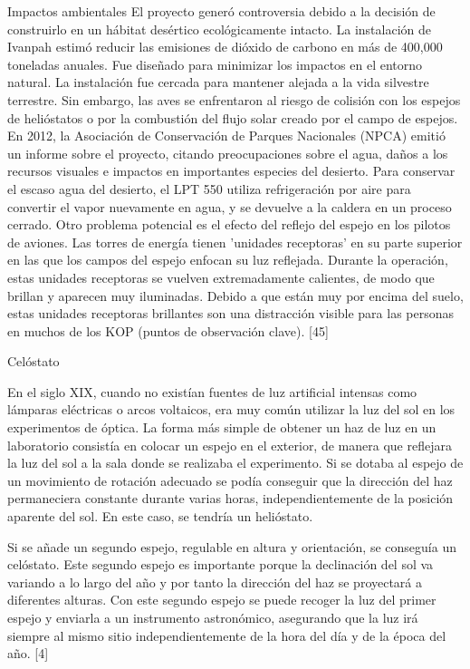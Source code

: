 \documentclass[12pt]{article}
\begin{document}
Impactos ambientales
El proyecto generó controversia debido a la decisión de construirlo en un hábitat desértico ecológicamente intacto. La instalación de Ivanpah estimó reducir las emisiones de dióxido de carbono en más de 400,000 toneladas anuales. Fue diseñado para minimizar los impactos en el entorno natural. La instalación fue cercada para mantener alejada a la vida silvestre terrestre. Sin embargo, las aves se enfrentaron al riesgo de colisión con los espejos de helióstatos o por la combustión del flujo solar creado por el campo de espejos.
En 2012, la Asociación de Conservación de Parques Nacionales (NPCA) emitió un informe sobre el proyecto, citando preocupaciones sobre el agua, daños a los recursos visuales e impactos en importantes especies del desierto. Para conservar el escaso agua del desierto, el LPT 550 utiliza refrigeración por aire para convertir el vapor nuevamente en agua, y se devuelve a la caldera en un proceso cerrado.
Otro problema potencial es el efecto del reflejo del espejo en los pilotos de aviones. Las torres de energía tienen 'unidades receptoras' en su parte superior en las que los campos del espejo enfocan su luz reflejada. Durante la operación, estas unidades receptoras se vuelven extremadamente calientes, de modo que brillan y aparecen muy iluminadas. Debido a que están muy por encima del suelo, estas unidades receptoras brillantes son una distracción visible para las personas en muchos de los KOP (puntos de observación clave). [45]
 
 
Celóstato

En el siglo XIX, cuando no existían fuentes de luz artificial intensas como lámparas eléctricas o arcos voltaicos, era muy común utilizar la luz del sol en los experimentos de óptica. La forma más simple de obtener un haz de luz en un laboratorio consistía en colocar un espejo en el exterior, de manera que reflejara la luz del sol a la sala donde se realizaba el experimento. Si se dotaba al espejo de un movimiento de rotación adecuado se podía conseguir que la dirección del haz permaneciera constante durante varias horas, independientemente de la posición aparente del sol. En este caso, se tendría un helióstato.

Si se añade un segundo espejo, regulable en altura y orientación, se conseguía un celóstato. Este segundo espejo es importante porque la declinación del sol va variando a lo largo del año y por tanto la dirección del haz se proyectará a diferentes alturas. Con este segundo espejo se puede recoger la luz del primer espejo y enviarla a un instrumento astronómico, asegurando que la luz irá siempre al mismo sitio independientemente de la hora del día y de la época del año. [4]
\end{document}
